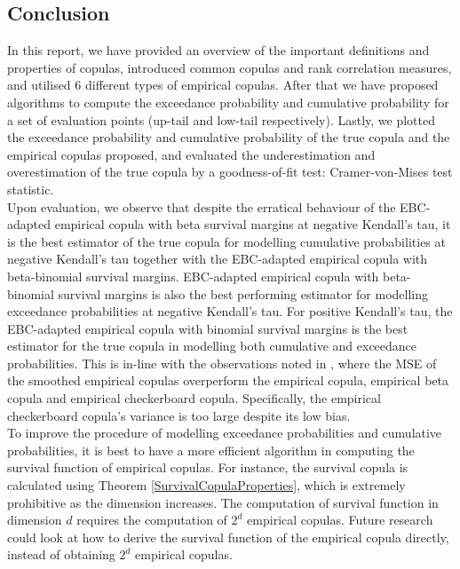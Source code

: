 \documentclass[12pt]{report}
\newcommand{\1}{\mathbf{1}}
\begin{document}
\begin{flushleft}
\section{Conclusion}
\vspace{0.5cm}
In this report, we have provided an overview of the important definitions and properties of copulas, introduced common copulas and rank correlation measures, and utilised 6 different types of empirical copulas. After that we have proposed algorithms to compute the exceedance probability and cumulative probability for a set of evaluation points (up-tail and low-tail respectively). Lastly, we plotted the exceedance probability and cumulative probability of the true copula and the empirical copulas proposed, and evaluated the underestimation and overestimation of the true copula by a goodness-of-fit test: Cramer-von-Mises test statistic.\\
\vspace{0.5cm}
Upon evaluation, we observe that despite the erratical behaviour of the EBC-adapted empirical copula with beta survival margins at negative Kendall's tau, it is the best estimator of the true copula for modelling cumulative probabilities at negative Kendall's tau together with the EBC-adapted empirical copula with beta-binomial survival margins. EBC-adapted empirical copula with beta-binomial survival margins is also the best performing estimator for modelling exceedance probabilities at negative Kendall's tau. For positive Kendall's tau, the EBC-adapted empirical copula with binomial survival margins is the best estimator for the true copula in modelling both cumulative and exceedance probabilities. This is in-line with the observations noted in \cite{KojadinovicYi2024Smooth}, where the MSE of the smoothed empirical copulas overperform the empirical copula, empirical beta copula and empirical checkerboard copula. Specifically, the empirical checkerboard copula's variance is too large despite its low bias.\\
\vspace{0.5cm}
To improve the procedure of modelling exceedance probabilities and cumulative probabilities, it is best to have a more efficient algorithm in computing the survival function of empirical copulas. For instance, the survival copula is calculated using Theorem \ref{SurvivalCopulaProperties}, which is extremely prohibitive as the dimension increases. The computation of survival function in dimension $d$ requires the computation of $2^{d}$ empirical copulas. Future research could look at how to derive the survival function of the empirical copula directly, instead of obtaining $2^{d}$ empirical copulas.\\

\end{flushleft}
\end{document}
